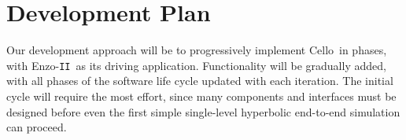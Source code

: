 \documentclass[11pt,letterpaper]{article}
\newcommand{\cello}{\textsf{Cello}}
\newcommand{\enzoii}{\textsf{Enzo}-\texttt{II}}
\begin{document}

\section{Development Plan} \label{s:plan}




Our development approach will be to progressively implement \cello\ in
phases, with \enzoii\ as its driving application.  Functionality will
be gradually added, with all phases of the software life cycle updated
with each iteration.  The initial cycle will require the most effort,
since many components and interfaces must be designed before even the
first simple single-level hyperbolic end-to-end simulation can
proceed.
\end{document}
